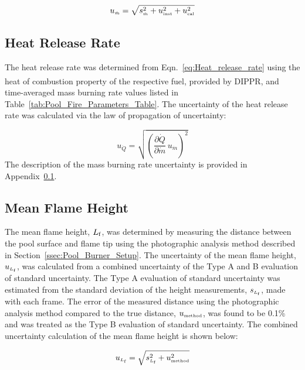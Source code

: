 \documentclass[12pt]{article}
\begin{document}
\begin{equation}
\label{eq:mass_rate_uncertainty}
u_{\scriptscriptstyle \dot{m}} = \sqrt{s_{\scriptscriptstyle \dot{m}}^2+u_{\rm \scriptscriptstyle inst}^2+u_{\rm \scriptscriptstyle cal}^2}
\end{equation}

\subsection{Heat Release Rate}
\label{ssec:Heat_Release_Rate}
The heat release rate was determined from Eqn.~\ref{eq:Heat_release_rate} using the heat of combustion property of the respective fuel, provided by DIPPR\textsuperscript{\textregistered}, and time-averaged mass burning rate values listed in Table~\ref{tab:Pool_Fire_Parameters_Table}. The uncertainty of the heat release rate was calculated via the law of propagation of uncertainty:

\begin{equation}
\label{eq:heat_release_rate_uncertainty}
u_{\scriptscriptstyle \dot{Q}} = \sqrt{{\left(\frac{\partial \dot{Q}}{\partial \dot{m}}\,u_{\scriptscriptstyle \dot{m}} \right)}^2}
\end{equation}
The description of the mass burning rate uncertainty is provided in Appendix~\ref{ssec:Heat_Release_Rate}.

\subsection{Mean Flame Height}
\label{ssec:Mean_Flame_Height}
The mean flame height, ${L_{\rm{f}}}$, was determined by measuring the distance between the pool surface and flame tip using the photographic analysis method described in Section~\ref{ssec:Pool_Burner_Setup}. The uncertainty of the mean flame height, $u_{\scriptscriptstyle L_{\rm{f}}}$, was calculated from a combined uncertainty of the Type A and B evaluation of standard uncertainty. The Type A evaluation of standard uncertainty was estimated from the standard deviation of the height measurements, $s_{\scriptscriptstyle L_{\rm{f}}}$, made with each frame. The error of the measured distance using the photographic analysis method compared to the true distance, $u_{\scriptscriptstyle \rm{method}}$,  was found to be 0.1\% and was treated as the Type B evaluation of standard uncertainty. The combined uncertainty calculation of the mean flame height is shown below:

\begin{equation}
\label{eq:mean_flame_height}
u_{\scriptscriptstyle L_{\rm{f}}} = \sqrt{s_{\scriptscriptstyle{L_{\rm{f}}}}^2+u_{\rm \scriptscriptstyle method}^2}
\end{equation}
\end{document}
